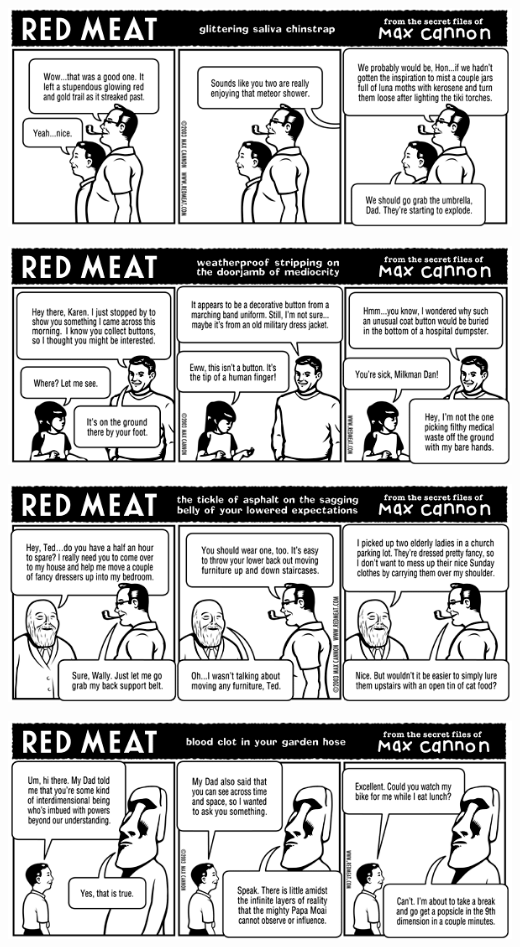 \documentclass[a4paper,twoside,11pt]{article}
\begin{document}
\includegraphics[width=\textwidth]{redmeat_2003-03-18.png}



\includegraphics[width=\textwidth]{redmeat_2003-03-25.png}



\includegraphics[width=\textwidth]{redmeat_2003-04-01.png}



\includegraphics[width=\textwidth]{redmeat_2003-04-08.png}
\end{document}
